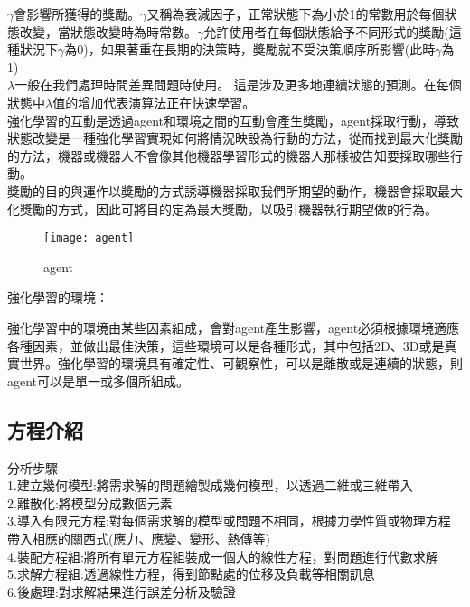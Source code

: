 $\gamma$會影響所獲得的獎勵。$\gamma$又稱為衰減因子，正常狀態下為小於1的常數用於每個狀態改變，當狀態改變時為時常數。$\gamma$允許使用者在每個狀態給予不同形式的獎勵(這種狀況下$\gamma$為0)，如果著重在長期的決策時，獎勵就不受決策順序所影響(此時$\gamma$為1)\\

$\lambda$一般在我們處理時間差異問題時使用。 這是涉及更多地連續狀態的預測。在每個狀態中$\lambda$值的增加代表演算法正在快速學習。\\
\iffalse
\begin{figure}[hbt!]
\begin{center}
\texttt{[image:  Reinforcement\_Learning\_interactions]}
\caption{\Large Reinforcement Learning interactions}
\end{center}
\end{figure}
\fi

強化學習的互動是透過agent和環境之間的互動會產生獎勵，agent採取行動，導致狀態改變是一種強化學習實現如何將情況映設為行動的方法，從而找到最大化獎勵的方法，機器或機器人不會像其他機器學習形式的機器人那樣被告知要採取哪些行動。\\

獎勵的目的與運作以獎勵的方式誘導機器採取我們所期望的動作，機器會採取最大化獎勵的方式，因此可將目的定為最大獎勵，以吸引機器執行期望做的行為。\\

\begin{figure}[hbt!]
\begin{center}
\texttt{[image: agent]}
\caption{\Large agent}
\label{agent}
\end{center}
\end{figure}
\begin{flushleft}
強化學習的環境：\\
\end{flushleft}
強化學習中的環境由某些因素組成，會對agent產生影響，agent必須根據環境適應各種因素，並做出最佳決策，這些環境可以是各種形式，其中包括2D、3D或是真實世界。強化學習的環境具有確定性、可觀察性，可以是離散或是連續的狀態，則agent可以是單一或多個所組成。\\
\subsection{方程介紹}
分析步驟\\
1.建立幾何模型:將需求解的問題繪製成幾何模型，以透過二維或三維帶入\\
2.離散化:將模型分成數個元素\\
3.導入有限元方程:對每個需求解的模型或問題不相同，根據力學性質或物理方程帶入相應的關西式(應力、應變、變形、熱傳等)\\
4.裝配方程組:將所有單元方程組裝成一個大的線性方程，對問題進行代數求解\\
5.求解方程組:透過線性方程，得到節點處的位移及負載等相關訊息\\
6.後處理:對求解結果進行誤差分析及驗證\\

